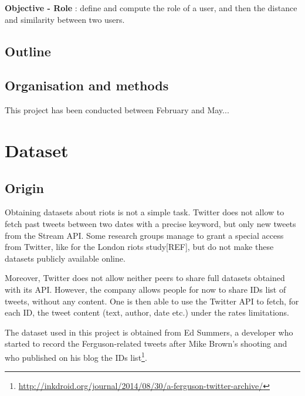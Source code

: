 \documentclass[a4paper,12pt]{report}
\begin{document}
\begin{objbox}\color{Maroon}
\textbf{Objective - Role} : define and compute the role of a user, and then the distance and similarity between two users.
\end{objbox}

\newpage
\section{Outline}

\newpage

\section{Organisation and methods}

This project has been conducted between February and May...



\chapter{Dataset}

\section{Origin}
Obtaining datasets about riots is not a simple task. Twitter does not allow to fetch past tweets between two dates with a precise keyword, but only new tweets from the Stream API. Some research groups manage to grant a special access from Twitter, like for the London riots study[REF], but do not make these datasets publicly available online.

Moreover, Twitter does not allow neither peers to share full datasets obtained with its API. However, the company allows people for now to share IDs list of tweets, without any content. One is then able to use the Twitter API to fetch, for each ID, the tweet content (text, author, date etc.) under the rates limitations.

The dataset used in this project is obtained from Ed Summers, a developer who started to record the Ferguson-related tweets after Mike Brown's shooting and who published on his blog the IDs list\footnote{\url{http://inkdroid.org/journal/2014/08/30/a-ferguson-twitter-archive/}}.
\end{document}
